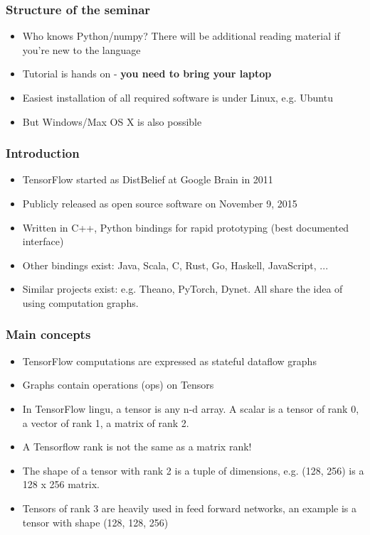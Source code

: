 \documentclass{beamer}
\begin{document}
\begin{frame}
\frametitle{Structure of the seminar}
  \begin{itemize}
  	\item Who knows Python/numpy? There will be additional reading material if you're new to the language
  	\item Tutorial is hands on - \textbf{you need to bring your laptop}
  	\item Easiest installation of all required software is under Linux, e.g. Ubuntu
  	\item But Windows/Max OS X is also possible
  \end{itemize}
\end{frame}

\begin{frame}
\frametitle{Introduction}
  \begin{itemize}
	\item TensorFlow started as DistBelief at Google Brain in 2011
	\item Publicly released as  open source software on November 9, 2015
	\item Written in C++, Python bindings for rapid prototyping (best documented interface)
	\item Other bindings exist: Java, Scala, C\sharp , Rust, Go, Haskell, JavaScript, ...
    \item Similar projects exist: e.g. Theano, PyTorch, Dynet. All share the idea of using computation graphs.
  \end{itemize}
\end{frame}

\begin{frame}
  \frametitle{Main concepts}
  \begin{itemize}
		\item TensorFlow computations are expressed as stateful dataflow graphs
		\item Graphs contain operations (ops) on Tensors
		\item In TensorFlow lingu, a tensor is any n-d array. A scalar is a tensor
      of rank 0, a vector of rank 1, a matrix of rank 2.
		\item A Tensorflow rank is not the same as a matrix rank!
		\item The shape of a tensor with rank 2 is a tuple of dimensions, e.g. (128, 256) is a 128 x 256 matrix. 
		\item Tensors of rank 3 are heavily used in feed forward networks, an example is a tensor with shape (128, 128, 256) 
  \end{itemize}
\end{frame}
\end{document}
